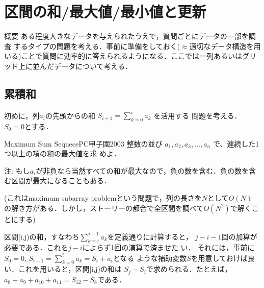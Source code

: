  \chapter{区間の和/最大値/最小値と更新}

\begin{versionbeta}

\begin{itembox}[l]{概要}
  ある程度大きなデータを与えられたうえで，質問ごとにデータの一部を調査
するタイプの問題を考える．事前に準備をしておく($\approx$適切なデータ構造を用いる)ことで質問に効率的に答えられるようになる．ここでは一列あるいはグリッド上に並んだデータについて考える．
\end{itembox}

\section{累積和}

初めに，列$a_i$の先頭からの和 $S_{i+1} = \sum_{k=0}^i a_k$ を活用する
問題を考える．$S_0=0$とする．

\begin{psbox}{Maximum Sum Sequece}{PC甲子園2003}
整数の並び $a_1, a_2, a_3, \ldots, a_n$ で、連続した1つ以上の項の和の最大値を求
めよ．

注: もし$a_i$が非負なら当然すべての和が最大なので，負の数を含む．負の数を含む区間が最大になることもある．

\end{psbox}

(これはmaximum subarray problemという問題で，列の長さを$N$として$O(N)$
の解き方がある．しかし，ストーリーの都合で全区間を調べて$O(N^2)$で解くことにする)

区間[i,j)の和，すなわち$\sum_{k=i}^{j-1} a_k$を定義通りに計算すると，
$j-i-1$回の加算が必要である．これを$j-i$によらず1回の演算で済ませた
い．
それには，事前に $S_0=0$, $S_{i+1} = \sum_{k=0}^i a_k = S_i+a_i$となる
ような補助変数$S$を用意しておけば良い．これを用いると，区間[i,j)の和は
  $S_j-S_i$で求められる．たとえば，$a_8+a_9+a_{10}+a_{11} = S_{12} - S_8$である．

\begin{center}
\begin{tikzpicture}[y=5mm]


\end{tikzpicture}
\end{center}
\end{versionbeta}
